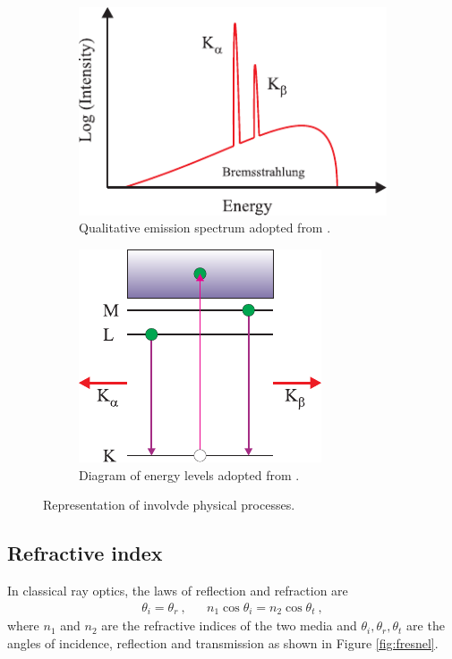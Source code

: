 \begin{figure}[H]
	\begin{subfigure}{0.5\textwidth}
		\centering
		\includegraphics{content/graphics/XraySpectrum.pdf}
		\caption{Qualitative emission spectrum adopted from \cite{McMorrow_2011_2}.}
		\label{fig:spectrum}
	\end{subfigure}
	\hfill
	\begin{subfigure}{0.5\textwidth}
		\centering
		\includegraphics{content/graphics/LevelDiagram.pdf}
		\caption{Diagram of energy levels adopted from \cite{McMorrow_2011_2}.}
		\label{fig:levels}
	\end{subfigure}
	\caption{Representation of involvde physical processes.}
	\label{fig:process}
\end{figure}



\subsection{Refractive index}

In classical ray optics, the laws of reflection and refraction are
\begin{align}
	\theta_i = \theta_r \: , && n_1 \cos\theta_i = n_2 \cos\theta_t \: ,
	\label{eqn:snell}
\end{align}
where $n_1$ and $n_2$ are the refractive indices of the two media and $\theta_i, \theta_r, \theta_t$ are the angles of incidence, reflection
and transmission as shown in Figure \ref{fig:fresnel}.

